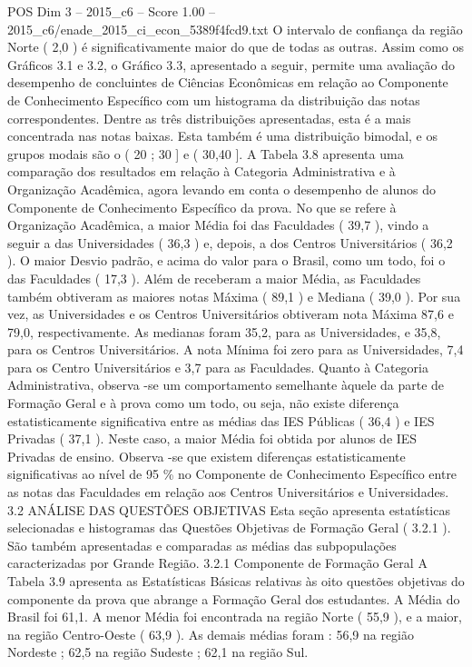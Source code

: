 \begin{textsample}{POS Dim 3 – 2015\_c6 – Score 1.00 – 2015\_c6/enade\_2015\_ci\_econ\_5389f4fcd9.txt}
O intervalo de confiança da região Norte ( 2,0 ) é significativamente maior do que de todas as outras.
Assim como os Gráficos 3.1 e 3.2, o Gráfico 3.3, apresentado a seguir, permite uma avaliação do desempenho de concluintes de Ciências Econômicas em relação ao Componente de Conhecimento Específico com um histograma da distribuição das notas correspondentes.
Dentre as três distribuições apresentadas, esta é a mais concentrada nas notas baixas.
Esta também é uma distribuição bimodal, e os grupos modais são o ( 20 ; 30 ] e ( 30,40 ].
A Tabela 3.8 apresenta uma comparação dos resultados em relação à Categoria Administrativa e à Organização Acadêmica, agora levando em conta o desempenho de alunos do Componente de Conhecimento Específico da prova.
No que se refere à Organização Acadêmica, a maior Média foi das Faculdades ( 39,7 ), vindo a seguir a das Universidades ( 36,3 ) e, depois, a dos Centros Universitários ( 36,2 ).
O maior Desvio padrão, e acima do valor para o Brasil, como um todo, foi o das Faculdades ( 17,3 ).
Além de receberam a maior Média, as Faculdades também obtiveram as maiores notas Máxima ( 89,1 ) e Mediana ( 39,0 ).
Por sua vez, as Universidades e os Centros Universitários obtiveram nota Máxima 87,6 e 79,0, respectivamente.
As medianas foram 35,2, para as Universidades, e 35,8, para os Centros Universitários.
A nota Mínima foi zero para as Universidades, 7,4 para os Centro Universitários e 3,7 para as Faculdades.
Quanto à Categoria Administrativa, observa -se um comportamento semelhante àquele da parte de Formação Geral e à prova como um todo, ou seja, não existe diferença estatisticamente significativa entre as médias das IES Públicas ( 36,4 ) e IES Privadas ( 37,1 ).
Neste caso, a maior Média foi obtida por alunos de IES Privadas de ensino.
Observa -se que existem diferenças estatisticamente significativas ao nível de 95 \% no Componente de Conhecimento Específico entre as notas das Faculdades em relação aos Centros Universitários e Universidades. 3.2 ANÁLISE DAS QUESTÕES OBJETIVAS Esta seção apresenta estatísticas selecionadas e histogramas das Questões Objetivas de Formação Geral ( 3.2.1 ).
São também apresentadas e comparadas as médias das subpopulações caracterizadas por Grande Região. 3.2.1 Componente de Formação Geral A Tabela 3.9 apresenta as Estatísticas Básicas relativas às oito questões objetivas do componente da prova que abrange a Formação Geral dos estudantes.
A Média do Brasil foi 61,1.
A menor Média foi encontrada na região Norte ( 55,9 ), e a maior, na região Centro-Oeste ( 63,9 ).
As demais médias foram : 56,9 na região Nordeste ; 62,5 na região Sudeste ; 62,1 na região Sul.

\end{textsample}
